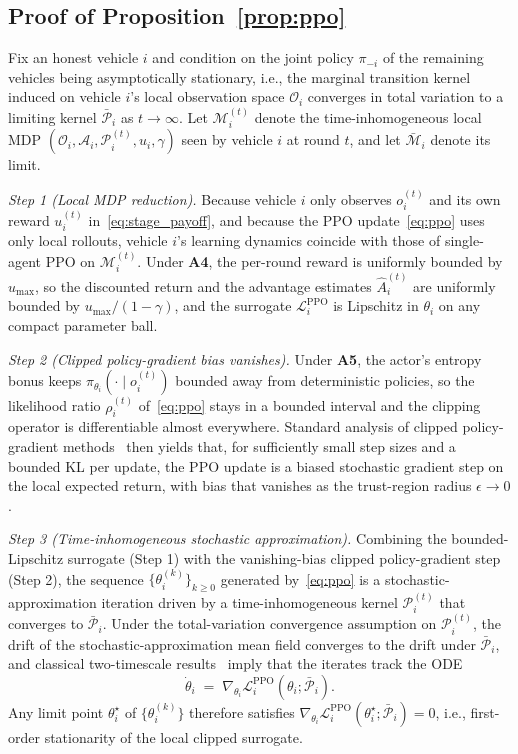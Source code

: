 \subsection{Proof of Proposition~\ref{prop:ppo}}
\label{app:proof-ppo}

Fix an honest vehicle $i$ and condition on the joint policy $\pi_{-i}$ of the remaining vehicles being asymptotically stationary, i.e., the marginal transition kernel induced on vehicle $i$'s local observation space $\mathcal{O}_i$ converges in total variation to a limiting kernel $\bar{\mathcal{P}}_i$ as $t\to\infty$. Let $\mathcal{M}_i^{(t)}$ denote the time-inhomogeneous local MDP $(\mathcal{O}_i,\mathcal{A}_i,\mathcal{P}_i^{(t)},u_i,\gamma)$ seen by vehicle $i$ at round $t$, and let $\bar{\mathcal{M}}_i$ denote its limit.

\emph{Step 1 (Local MDP reduction).} Because vehicle $i$ only observes $o_i^{(t)}$ and its own reward $u_i^{(t)}$ in~\eqref{eq:stage_payoff}, and because the PPO update~\eqref{eq:ppo} uses only local rollouts, vehicle $i$'s learning dynamics coincide with those of single-agent PPO on $\mathcal{M}_i^{(t)}$. Under \textbf{A4}, the per-round reward is uniformly bounded by $u_{\max}$, so the discounted return and the advantage estimates $\hat A_i^{(t)}$ are uniformly bounded by $u_{\max}/(1-\gamma)$, and the surrogate $\mathcal{L}_i^{\mathrm{PPO}}$ is Lipschitz in $\theta_i$ on any compact parameter ball.

\emph{Step 2 (Clipped policy-gradient bias vanishes).} Under \textbf{A5}, the actor's entropy bonus keeps $\pi_{\theta_i}(\cdot\mid o_i^{(t)})$ bounded away from deterministic policies, so the likelihood ratio $\rho_i^{(t)}$ of~\eqref{eq:ppo} stays in a bounded interval and the clipping operator is differentiable almost everywhere. Standard analysis of clipped policy-gradient methods~\cite{schulman2017ppo,shani2020adaptive,liu2019neural} then yields that, for sufficiently small step sizes and a bounded KL per update, the PPO update is a biased stochastic gradient step on the local expected return, with bias that vanishes as the trust-region radius $\epsilon\to 0$.

\emph{Step 3 (Time-inhomogeneous stochastic approximation).} Combining the bounded-Lipschitz surrogate (Step 1) with the vanishing-bias clipped policy-gradient step (Step 2), the sequence $\{\theta_i^{(k)}\}_{k\ge 0}$ generated by~\eqref{eq:ppo} is a stochastic-approximation iteration driven by a time-inhomogeneous kernel $\mathcal{P}_i^{(t)}$ that converges to $\bar{\mathcal{P}}_i$. Under the total-variation convergence assumption on $\mathcal{P}_i^{(t)}$, the drift of the stochastic-approximation mean field converges to the drift under $\bar{\mathcal{P}}_i$, and classical two-timescale results~\cite{borkar2008stochastic} imply that the iterates track the ODE
\begin{equation*}
    \dot\theta_i \;=\; \nabla_{\theta_i}\mathcal{L}_i^{\mathrm{PPO}}(\theta_i;\bar{\mathcal{P}}_i).
\end{equation*}
Any limit point $\theta_i^\star$ of $\{\theta_i^{(k)}\}$ therefore satisfies $\nabla_{\theta_i}\mathcal{L}_i^{\mathrm{PPO}}(\theta_i^\star;\bar{\mathcal{P}}_i)=0$, i.e., first-order stationarity of the local clipped surrogate.

